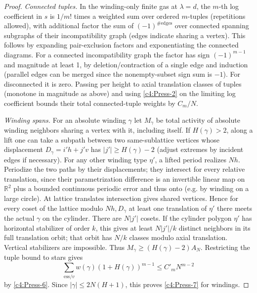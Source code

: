 \begin{proof}
\emph{Connected tuples.}
In the winding-only finite gas at \(\lambda=d\), the \(m\)-th log coefficient in \(s\) is \(1/m!\) times a weighted sum over ordered \(m\)-tuples (repetitions allowed), with additional factor the sum of \((-1)^{\#\mathrm{edges}}\) over connected spanning subgraphs of their incompatibility graph (edges indicate sharing a vertex). This follows by expanding pair-exclusion factors and exponentiating the connected diagrams. For a connected incompatibility graph the factor has sign \((-1)^{m-1}\) and magnitude at least 1, by deletion/contraction of a single edge and induction (parallel edges can be merged since the nonempty-subset sign sum is \(-1\)). For disconnected it is zero. Passing per height to axial translation classes of tuples (monotone in magnitude as above) and using \eqref{c4:Press-2} on the limiting log coefficient bounds their total connected-tuple weights by \(C_m/N\).

\emph{Winding spans.}
For an absolute winding \(\gamma\) let \(M_\gamma\) be total activity of absolute winding neighbors sharing a vertex with it, including itself. If \(H(\gamma)>2\), along a lift one can take a subpath between two same-sublattice vertices whose displacement \(D_\gamma=i'h+j'v\) has \(|j'|\ge H(\gamma)-2\) (adjust extremes by incident edges if necessary). For any other winding type \(\eta'\), a lifted period realizes \(Nh\). Periodize the two paths by their displacements; they intersect for every relative translation, since their parametrization difference is an invertible linear map on \(\mathbb R^2\) plus a bounded continuous periodic error and thus onto (e.g. by winding on a large circle). At lattice translates intersection gives shared vertices. Hence for every coset of the lattice modulo \(Nh,D_\gamma\) at least one translation of \(\eta'\) there meets the actual \(\gamma\) on the cylinder. There are \(N|j'|\) cosets. If the cylinder polygon \(\eta'\) has horizontal stabilizer of order \(k\), this gives at least \(N|j'|/k\) distinct neighbors in its full translation orbit; that orbit has \(N/k\) classes modulo axial translation. Vertical stabilizers are impossible. Thus \(M_\gamma\ge(H(\gamma)-2) A_N\). Restricting the tuple bound to stars gives
\[
         \sum_{\mathrm{ess}/v} w(\gamma)(1+H(\gamma))^{m-1}\le C'_m N^{m-2}
\]
by \eqref{c4:Press-6}. Since \(|\gamma|\le2N(H+1)\), this proves \eqref{c4:Press-7} for windings.


\end{proof}
